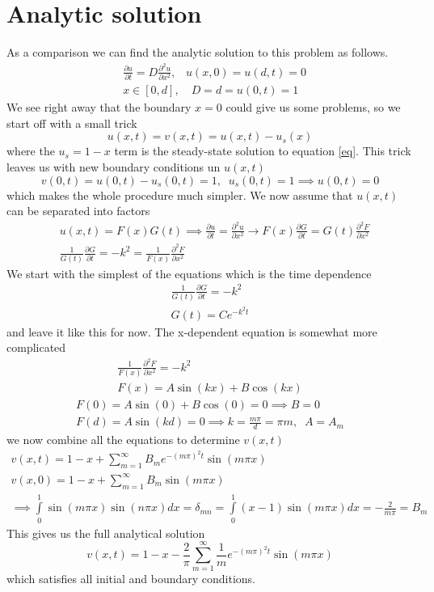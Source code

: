 \documentclass[a4paper,english, 10pt, twoside]{article}
\begin{document}
\section{Analytic solution}\label{analytic}
As a comparison we can find the analytic solution to this problem as follows. 
 \begin{align}\label{eq}
  &\frac{\partial u}{\partial t} = D\frac{\partial^2 u}{\partial x^2}, \,\,\,\,\, u(x,0) = u(d,t) = 0\\
  &x\in[0,d],\,\,\,\,\,\, D = d = u(0,t) = 1
 \end{align}
We see right away that the boundary $x=0$ could give us some problems, so we start off with a small trick
$$
u(x,t) = v(x,t) = u(x,t) - u_s(x)
$$
where the $u_s = 1-x$ term is the steady-state solution to equation \ref{eq}. This trick leaves us with new boundary conditions 
un $u(x,t)$ 
$$
v(0,t) = u(0,t) - u_s(0,t) = 1, \;\; u_s(0,t) = 1 \implies u(0,t) = 0
$$
which makes the whole procedure much simpler. We now assume that $u(x,t)$ can be separated into factors 
\begin{align*}
&u(x,t) = F(x)G(t) \implies \frac{\partial u}{\partial t} = \frac{\partial^2 u}{\partial x^2} \to F(x)\frac{\partial G}{\partial t}
= G(t)\frac{\partial^2 F}{\partial x^2}\\
&\frac{1}{G(t)}\frac{\partial G}{\partial t} =-k^2 =  \frac{1}{F(x)}\frac{\partial^2 F}{\partial x^2}
\end{align*}
We start with the simplest of the equations which is the time dependence
\begin{align*}
 \frac{1}{G(t)}\frac{\partial G}{\partial t} =-k^2\\
 G(t) =C e^{-k^2t}
\end{align*}
and leave it like this for now. The x-dependent equation is somewhat more complicated
\begin{align*}
 \frac{1}{F(x)}\frac{\partial^2 F}{\partial x^2} = -k^2 \\
 F(x) = A\sin(kx) + B\cos(kx)
\end{align*}
\begin{align*}
 F(0) = A\sin(0) + B\cos(0) = 0 \implies B= 0\\
 F(d) = A\sin(kd) = 0 \implies k = \frac{m\pi}{d} = \pi m, \;\; A = A_m
\end{align*}
we now combine all the equations to determine $v(x,t)$
\begin{align*}
 v(x,t) = 1-x + \sum\limits_{m=1}^{\infty}B_me^{-(m\pi)^2t}\sin(m\pi x) \\
 v(x,0) = 1-x +\sum\limits_{m=1}^{\infty}B_m\sin(m\pi x)\\
 \implies \int\limits_0^1\sin(m\pi x)\sin(n\pi x)dx = \delta_{mn} = \int\limits_0^1(x-1)\sin(m\pi x)dx = -\frac{2}{m\pi} = B_m
\end{align*}
This gives us the full analytical solution 
\begin{equation}\label{solution}
 v(x,t) = 1-x-\frac{2}{\pi}\sum\limits_{m = 1}^{\infty}\frac{1}{m}e^{-(m\pi)^2t}\sin(m\pi x) 
\end{equation}
which satisfies all initial and boundary conditions.
\end{document}
